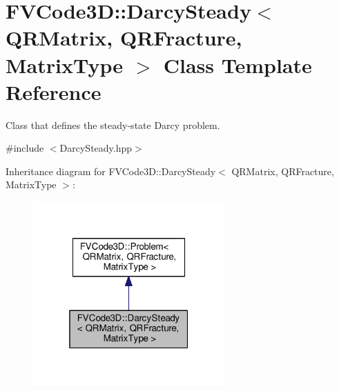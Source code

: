 \hypertarget{classFVCode3D_1_1DarcySteady}{}\section{F\+V\+Code3D\+:\+:Darcy\+Steady$<$ Q\+R\+Matrix, Q\+R\+Fracture, Matrix\+Type $>$ Class Template Reference}
\label{classFVCode3D_1_1DarcySteady}


Class that defines the steady-\/state Darcy problem.  




{\ttfamily \#include $<$Darcy\+Steady.\+hpp$>$}



Inheritance diagram for F\+V\+Code3D\+:\+:Darcy\+Steady$<$ Q\+R\+Matrix, Q\+R\+Fracture, Matrix\+Type $>$\+:
\nopagebreak
\begin{figure}[H]
\begin{center}
\leavevmode
\includegraphics[width=208pt]{classFVCode3D_1_1DarcySteady__inherit__graph}
\end{center}
\end{figure}


